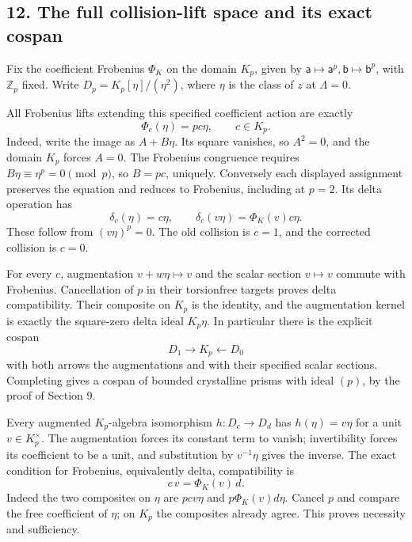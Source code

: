 \documentclass[
]{article}
\begin{document}
\subsection{12. The full collision-lift space and its exact
cospan}\label{the-full-collision-lift-space-and-its-exact-cospan}

Fix the coefficient Frobenius \(\Phi_K\) on the domain \(K_p\), given by
\(\mathsf a\mapsto\mathsf a^p,\mathsf b\mapsto\mathsf b^p\), with
\(\mathbb Z_p\) fixed. Write \(D_p=K_p[\eta]/(\eta^2)\), where \(\eta\)
is the class of \(z\) at \(\Lambda=0\).

All Frobenius lifts extending this specified coefficient action are
exactly \[
\boxed{\Phi_c(\eta)=pc\eta,\qquad c\in K_p.}
\tag{OIF33}
\] Indeed, write the image as \(A+B\eta\). Its square vanishes, so
\(A^2=0\), and the domain \(K_p\) forces \(A=0\). The Frobenius
congruence requires \(B\eta\equiv\eta^p=0\pmod p\), so \(B=pc\),
uniquely. Conversely each displayed assignment preserves the equation
and reduces to Frobenius, including at \(p=2\). Its delta operation has
\[
\delta_c(\eta)=c\eta,\qquad
\delta_c(v\eta)=\Phi_K(v)c\eta.
\tag{OIF34}
\] These follow from \((v\eta)^p=0\). The old collision is \(c=1\), and
the corrected collision is \(c=0\).

For every \(c\), augmentation \(v+w\eta\mapsto v\) and the scalar
section \(v\mapsto v\) commute with Frobenius. Cancellation of \(p\) in
their torsionfree targets proves delta compatibility. Their composite on
\(K_p\) is the identity, and the augmentation kernel is exactly the
square-zero delta ideal \(K_p\eta\). In particular there is the explicit
cospan \[
\boxed{D_1\longrightarrow K_p\longleftarrow D_0}
\tag{OIF35}
\] with both arrows the augmentations and with their specified scalar
sections. Completing gives a cospan of bounded crystalline prisms with
ideal \((p)\), by the proof of Section 9.

Every augmented \(K_p\)-algebra isomorphism \(h:D_c\to D_d\) has
\(h(\eta)=v\eta\) for a unit \(v\in K_p^\times\). The augmentation
forces its constant term to vanish; invertibility forces its coefficient
to be a unit, and substitution by \(v^{-1}\eta\) gives the inverse. The
exact condition for Frobenius, equivalently delta, compatibility is \[
\boxed{c\,v=\Phi_K(v)\,d.}
\tag{OIF36}
\] Indeed the two composites on \(\eta\) are \(pcv\eta\) and
\(p\Phi_K(v)d\eta\). Cancel \(p\) and compare the free coefficient of
\(\eta\); on \(K_p\) the composites already agree. This proves necessity
and sufficiency.
\end{document}
